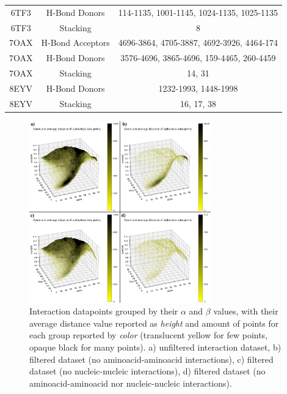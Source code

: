\begin{table}[H]
\begin{tabular}{ccc}
    6TF3 & H-Bond Donors    & 114-1135, 1001-1145, 1024-1135, 1025-1135                     \\
    6TF3 & Stacking         & 8                                                             \\
    7OAX & H-Bond Acceptors & 4696-3864, 4705-3887, 4692-3926, 4464-174                     \\
    7OAX & H-Bond Donors    & 3576-4696, 3865-4696, 159-4465, 260-4459                      \\
    7OAX & Stacking         & 14, 31                                                        \\
    8EYV & H-Bond Donors    & 1232-1993, 1448-1998                                          \\
    8EYV & Stacking         & 16, 17, 38                                                    \\ \hline
  \end{tabular}
\end{table}


\begin{figure}[H]
  \centering
  \includegraphics[width=0.7\textwidth]{figures/appendix/stacking_sampling.png}
  \caption{\label{fig:appx2/stacking_sampling} Interaction datapoints grouped by their $\alpha$ and $\beta$ values, with their average distance value reported as \textit{height} and amount of points for each group reported by \textit{color} (translucent yellow for few points, opaque black for many points). a) unfiltered interaction dataset, b) filtered dataset (no aminoacid-aminoacid interactions), c) filtered dataset (no nucleic-nucleic interactions), d) filtered dataset (no aminoacid-aminoacid nor nucleic-nucleic interactions).}
\end{figure}



